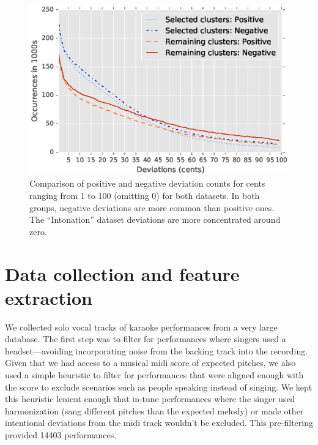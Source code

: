 \begin{figure}[h!]
    \centering
    \includegraphics[width=\textwidth]{figures/full_pos_vs_neg_line.eps}
    \caption{Comparison of positive and negative deviation counts for cents ranging from 1 to 100 (omitting 0) for both datasets. In both groups, negative deviations are more common than positive ones. The ``Intonation'' dataset deviations are more concentrated around zero. }
    \label{fig:pos_neg}
\end{figure}

\section{Data collection and feature extraction}
\label{sec:features}
We collected solo vocal tracks of karaoke performances from a very large database. The first step was to filter for performances where singers used a headset---avoiding incorporating noise from the backing track into the recording. Given that we had access to a musical \gls{midi} score of expected pitches, we also used a simple heuristic to filter for performances that were aligned enough with the score to exclude scenarios such as people speaking instead of singing. We kept this heuristic lenient enough that in-tune performances where the singer used harmonization (sang different pitches than the expected melody) or made other intentional deviations from the \gls{midi} track wouldn't be excluded. This pre-filtering provided 14403 performances. 

